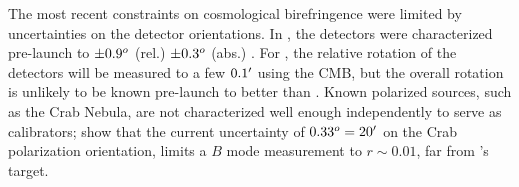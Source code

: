 \documentclass[PICOReport.tex]{subfiles}
\begin{document}
%
%

The most recent constraints on cosmological birefringence \citep{Planck2016_XLIX} were limited by uncertainties on the detector orientations.  In \planck, the detectors were characterized pre-launch to $\pm 0.9^o$ (rel.) $\pm 0.3^o$ (abs.) \citep{Rosset+2010}. For \pico, the relative rotation of the detectors will be measured to a few $0.1'$ using the CMB, but the overall rotation is unlikely to be known pre-launch to better than \planck.  Known polarized sources, such as the Crab Nebula, are not characterized well enough independently to serve as calibrators; \citet{Aumont+2018} show that the current uncertainty of $0.33^o = 20'$ on the Crab polarization orientation, limits a $B$ mode measurement to $r \sim 0.01$, far from \pico's target.

\end{document}
